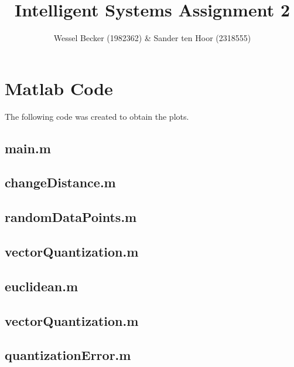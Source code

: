 \documentclass[10pt,a4paper]{article}
\begin{document}
\title{Intelligent Systems Assignment 2}
\author{Wessel Becker (1982362) \& Sander ten Hoor (2318555)}
\maketitle

\section{Matlab Code}
The following code was created to obtain the plots.

\subsection{main.m}


\subsection{changeDistance.m}


\subsection{randomDataPoints.m}


\subsection{vectorQuantization.m}


\subsection{euclidean.m}


\subsection{vectorQuantization.m}
	

\subsection{quantizationError.m}

\end{document}

